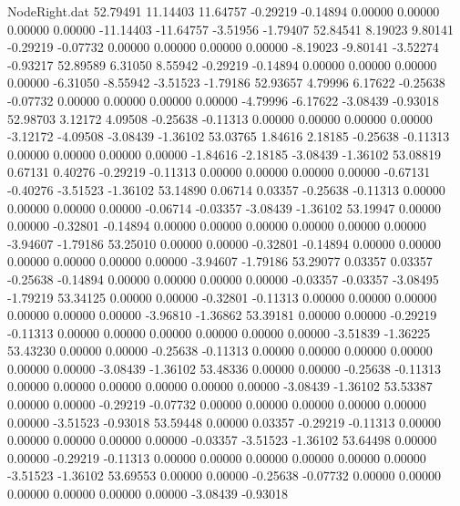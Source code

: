 \begin{filecontents}{NodeRight.dat}
  52.79491   11.14403   11.64757    -0.29219   -0.14894    0.00000    0.00000    0.00000    0.00000  -11.14403  -11.64757   -3.51956   -1.79407
  52.84541    8.19023    9.80141    -0.29219   -0.07732    0.00000    0.00000    0.00000    0.00000   -8.19023   -9.80141   -3.52274   -0.93217
  52.89589    6.31050    8.55942    -0.29219   -0.14894    0.00000    0.00000    0.00000    0.00000   -6.31050   -8.55942   -3.51523   -1.79186
  52.93657    4.79996    6.17622    -0.25638   -0.07732    0.00000    0.00000    0.00000    0.00000   -4.79996   -6.17622   -3.08439   -0.93018
  52.98703    3.12172    4.09508    -0.25638   -0.11313    0.00000    0.00000    0.00000    0.00000   -3.12172   -4.09508   -3.08439   -1.36102
  53.03765    1.84616    2.18185    -0.25638   -0.11313    0.00000    0.00000    0.00000    0.00000   -1.84616   -2.18185   -3.08439   -1.36102
  53.08819    0.67131    0.40276    -0.29219   -0.11313    0.00000    0.00000    0.00000    0.00000   -0.67131   -0.40276   -3.51523   -1.36102
  53.14890    0.06714    0.03357    -0.25638   -0.11313    0.00000    0.00000    0.00000    0.00000   -0.06714   -0.03357   -3.08439   -1.36102
  53.19947    0.00000    0.00000    -0.32801   -0.14894    0.00000    0.00000    0.00000    0.00000    0.00000    0.00000   -3.94607   -1.79186
  53.25010    0.00000    0.00000    -0.32801   -0.14894    0.00000    0.00000    0.00000    0.00000    0.00000    0.00000   -3.94607   -1.79186
  53.29077    0.03357    0.03357    -0.25638   -0.14894    0.00000    0.00000    0.00000    0.00000   -0.03357   -0.03357   -3.08495   -1.79219
  53.34125    0.00000    0.00000    -0.32801   -0.11313    0.00000    0.00000    0.00000    0.00000    0.00000    0.00000   -3.96810   -1.36862
  53.39181    0.00000    0.00000    -0.29219   -0.11313    0.00000    0.00000    0.00000    0.00000    0.00000    0.00000   -3.51839   -1.36225
  53.43230    0.00000    0.00000    -0.25638   -0.11313    0.00000    0.00000    0.00000    0.00000    0.00000    0.00000   -3.08439   -1.36102
  53.48336    0.00000    0.00000    -0.25638   -0.11313    0.00000    0.00000    0.00000    0.00000    0.00000    0.00000   -3.08439   -1.36102
  53.53387    0.00000    0.00000    -0.29219   -0.07732    0.00000    0.00000    0.00000    0.00000    0.00000    0.00000   -3.51523   -0.93018
  53.59448    0.00000    0.03357    -0.29219   -0.11313    0.00000    0.00000    0.00000    0.00000    0.00000   -0.03357   -3.51523   -1.36102
  53.64498    0.00000    0.00000    -0.29219   -0.11313    0.00000    0.00000    0.00000    0.00000    0.00000    0.00000   -3.51523   -1.36102
  53.69553    0.00000    0.00000    -0.25638   -0.07732    0.00000    0.00000    0.00000    0.00000    0.00000    0.00000   -3.08439   -0.93018

\end{filecontents}

